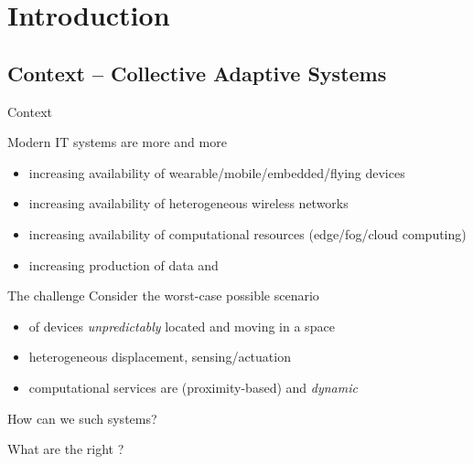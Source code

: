 \documentclass[presentation, 9pt]{beamer}\mode<presentation>{\usetheme{AMSBolognaFC}}
\begin{document}
\section{Introduction}
\subsection{Context -- Collective Adaptive Systems}
\begin{frame}{Context}\label{context:start}
\begin{exampleblock}{Modern IT systems are more and more }
	\begin{itemize}
		\item increasing availability of wearable/mobile/embedded/flying devices
		\item increasing availability of heterogeneous wireless networks
		\item increasing availability of computational resources (edge/fog/cloud computing)
		\item increasing production of data  and 
	\end{itemize}
\end{exampleblock}
\begin{alertblock}{The challenge}
	Consider the worst-case possible scenario
	\begin{itemize}
		\item {} of devices \emph{unpredictably} located and moving in a space
		\item heterogeneous displacement,  sensing/actuation
		\item computational services are  (proximity-based) and \emph{dynamic} 
	\end{itemize}
\end{alertblock}
\begin{center}
\Large{How can we  such systems?}
\end{center}
\begin{center}
	\Large{What are the right ?}
	\end{center}
\end{frame}
\end{document}
